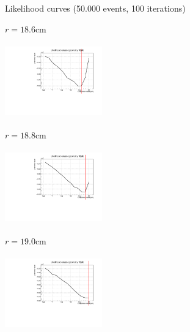 \documentclass[handout,8 pt]{beamer}
\begin{document}
\begin{frame}{Likelihood curves (50.000 events, 100 iterations)}
\vspace{-5pt}
\begin{minipage}[c]{.32\textwidth}
\begin{exampleblock}{} \begin{center}$r = 18.6$cm\end{center} \end{exampleblock}
\includegraphics[width=4.2cm, height=3.2cm]{figs/likelihood100HighStat/likelihood18p6.pdf} 
\end{minipage}
\begin{minipage}[c]{.32\textwidth}
\begin{exampleblock}{} \begin{center}$r = 18.8$cm\end{center} \end{exampleblock}
\includegraphics[width=4.2cm, height=3.2cm]{figs/likelihood100HighStat/likelihood18p8.pdf} 
\end{minipage}
\begin{minipage}[c]{.32\textwidth}
\begin{exampleblock}{} \begin{center}$r = 19.0$cm\end{center} \end{exampleblock}
\includegraphics[width=4.2cm, height=3.2cm]{figs/likelihood100HighStat/likelihood19p0.pdf} 
\end{minipage}
\end{frame}
\end{document}
